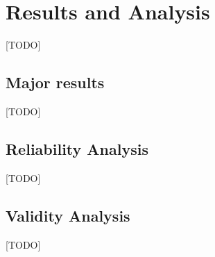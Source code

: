 \chapter{Results and Analysis} \label{ch:resultsAndAnalysis}

[TODO]

\section{Major results}
[TODO]

\section{Reliability Analysis}
[TODO]

\section{Validity Analysis}
[TODO]